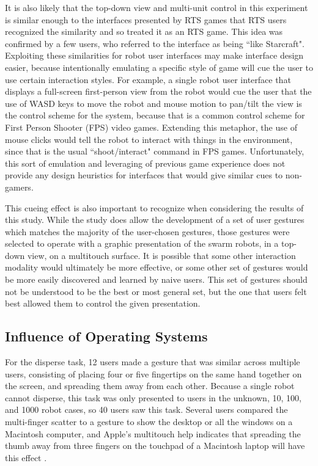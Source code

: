 It is also likely that the top-down view and multi-unit control in this experiment is similar enough to the interfaces presented by RTS games that RTS users recognized the similarity and so treated it as an RTS game.
This idea was confirmed by a few users, who referred to the interface as being ``like Starcraft". 
Exploiting these similarities for robot user interfaces may make interface design easier, because intentionally emulating a specific style of game will cue the user to use certain interaction styles. 
For example, a single robot user interface that displays a full-screen first-person view from the robot would cue the user that the use of WASD keys to move the robot and mouse motion to pan/tilt the view is the control scheme for the system, because that is a common control scheme for First Person Shooter (FPS) video games. 
Extending this metaphor, the use of mouse clicks would tell the robot to interact with things in the environment, since that is the usual ``shoot/interact" command in FPS games. 
Unfortunately, this sort of emulation and leveraging of previous game experience does not provide any design heuristics for interfaces that would give similar cues to non-gamers. 

This cueing effect is also important to recognize when considering the results of this study. 
While the study does allow the development of a set of user gestures which matches the majority of the user-chosen gestures, those gestures were selected to operate with a graphic presentation of the swarm robots, in a top-down view, on a multitouch surface. 
It is possible that some other interaction modality would ultimately be more effective, or some other set of gestures would be more easily discovered and learned by naive users. 
This set of gestures should not be understood to be the best or most general set, but the one that users felt best allowed them to control the given presentation. 

\subsection{Influence of Operating Systems}

For the disperse task, 12 users made a gesture that was similar across multiple users, consisting of placing four or five fingertips on the same hand together on the screen, and spreading them away from each other. 
Because a single robot cannot disperse, this task was only presented to users in the unknown, 10, 100, and 1000 robot cases, so 40 users saw this task. 
Several users compared the multi-finger scatter to a gesture to show the desktop or all the windows on a Macintosh computer, and Apple's multitouch help indicates that spreading the thumb away from three fingers on the touchpad of a Macintosh laptop will have this effect \citep{AppleTouchpadHelp}. 

